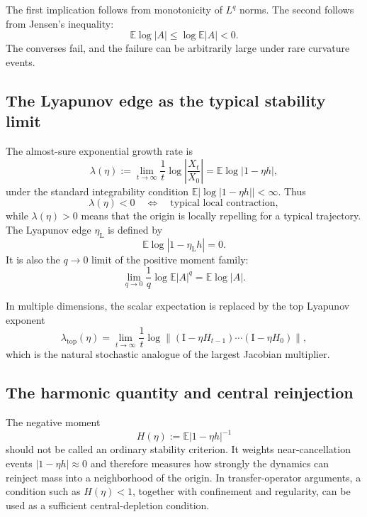 \documentclass[11pt]{article}
\newcommand{\E}{\mathbb{E}}
\newcommand{\Id}{\mathrm{I}}
\newcommand{\etal}{\eta_{\mathrm L}}
\newcommand{\norm}[1]{\left\lVert #1\right\rVert}
\begin{document}
\noindent The first implication follows from monotonicity of $L^q$ norms.  The second follows from Jensen's inequality:
\begin{equation}
    \E\log|A|\leq \log\E|A|<0.
\end{equation}
The converses fail, and the failure can be arbitrarily large under rare curvature events.

\subsection{The Lyapunov edge as the typical stability limit}

The almost-sure exponential growth rate is
\begin{equation}
    \lambda(\eta)
    :=\lim_{t\to\infty}\frac{1}{t}\log\left|\frac{X_t}{X_0}\right|
    =\E\log|1-\eta h|,
    \label{eq:lyapscalar}
\end{equation}
under the standard integrability condition $\E|\log|1-\eta h||<\infty$.  Thus
\begin{equation}
    \lambda(\eta)<0
    \quad\Longleftrightarrow\quad
    \text{typical local contraction},
\end{equation}
while $\lambda(\eta)>0$ means that the origin is locally repelling for a typical trajectory.  The Lyapunov edge $\etal$ is defined by
\begin{equation}
    \E\log|1-\etal h|=0.
    \label{eq:lyapedge}
\end{equation}
It is also the $q\to0$ limit of the positive moment family:
\begin{equation}
    \lim_{q\to0}\frac{1}{q}\log \E|A|^q=\E\log|A|.
\end{equation}

In multiple dimensions, the scalar expectation is replaced by the top Lyapunov exponent
\begin{equation}
 \lambda_{\mathrm{top}}(\eta)
 =\lim_{t\to\infty}\frac1t
 \log\norm{(\Id-\eta H_{t-1})\cdots(\Id-\eta H_0)},
 \label{eq:toplyap}
\end{equation}
which is the natural stochastic analogue of the largest Jacobian multiplier.

\subsection{The harmonic quantity and central reinjection}

The negative moment
\begin{equation}
    H(\eta):=\E|1-\eta h|^{-1}
    \label{eq:harmonic}
\end{equation}
should not be called an ordinary stability criterion.  It weights near-cancellation events $|1-\eta h|\approx0$ and therefore measures how strongly the dynamics can reinject mass into a neighborhood of the origin.  In transfer-operator arguments, a condition such as $H(\eta)<1$, together with confinement and regularity, can be used as a sufficient central-depletion condition.
\end{document}
